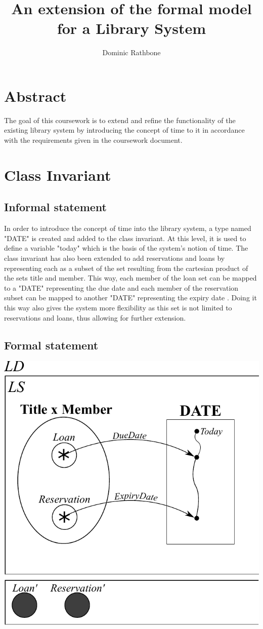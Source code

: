 \documentclass[]{report}
\title{An extension of the formal model for a Library System}
\author{Dominic Rathbone}
\begin{document}
\maketitle

\section{Abstract}
The goal of this coursework is to extend and refine the functionality of the existing library system by introducing the concept of time to it in accordance with the requirements given in the coursework document.

\section{Class Invariant}
\subsection{Informal statement}
In order to introduce the concept of time into the library system, a type named "DATE" is created and added to the class invariant. At this level, it is used to define a variable "today" which is the basis of the system's notion of time. The class invariant has also been extended to add reservations and loans by representing each as a subset of the set resulting from the cartesian product of the sets title and member. This way, each member of the loan set can be mapped to a "DATE" representing the due date and each member of the reservation subset can be mapped to another "DATE" representing the expiry date . Doing it this way also gives the system more flexibility as this set is not limited to reservations and loans, thus allowing for further extension.
\subsection{Formal statement}
\begin{center}
\includegraphics{class_invariant.pdf}
\end{center}
\newpage
\end{document}
